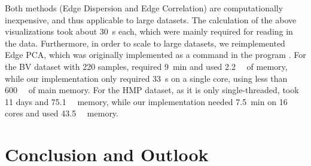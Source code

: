 Both methods (Edge Dispersion and Edge Correlation) are computationally inexpensive, and thus applicable to large datasets.
The calculation of the above visualizations took about \SI{30}{\second} each,
which were mainly required for reading in the data.
Furthermore, in order to scale to large datasets, we reimplemented Edge PCA,
which was originally implemented as a command in the  program \cite{Matsen2010}.
For the \ac{BV} dataset with \num{220} samples,
 required \SI{9}{\minute} and used \SI{2.2}{\giga\byte} of memory,
while our implementation only required \SI{33}{\second} on a single core, using less than \SI{600}{\mega\byte} of main memory.
For the \ac{HMP} dataset, as it is only single-threaded,  took \num{11} days and \SI{75.1}{\giga\byte} memory,
while our implementation needed \SI{7.5}{\minute} on \num{16} cores and used \SI{43.5}{\giga\byte} memory.



%


\section{Conclusion and Outlook}
\label{ch:Visualization:sec:ConclusionOutlook}

